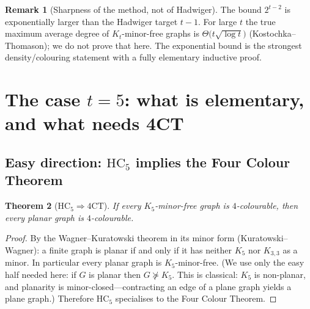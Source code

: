\documentclass[11pt]{article}
\newtheorem{theorem}{Theorem}[section]
\theoremstyle{definition}
\newtheorem{remark}[theorem]{Remark}
\begin{document}
\begin{remark}[Sharpness of the method, not of Hadwiger]
The bound \(2^{t-2}\) is exponentially larger than the Hadwiger target \(t-1\).
For large \(t\) the true maximum average degree of \(K_t\)-minor-free graphs is
\(\Theta\bigl(t\sqrt{\log t}\bigr)\) (Kostochka--Thomason); we do not prove that
here. The exponential bound is the strongest density/colouring statement with a
fully elementary inductive proof.
\end{remark}

\section{The case \(t=5\): what is elementary, and what needs 4CT}

\subsection{Easy direction: \(\mathrm{HC}_5\) implies the Four Colour Theorem}

\begin{theorem}[\(\mathrm{HC}_5\Rightarrow\mathrm{4CT}\)]\label{thm:hc5-to-4ct}
If every \(K_5\)-minor-free graph is \(4\)-colourable, then every planar graph is
\(4\)-colourable.
\end{theorem}

\begin{proof}
By the Wagner--Kuratowski theorem in its minor form (Kuratowski--Wagner): a
finite graph is planar if and only if it has neither \(K_5\) nor \(K_{3,3}\) as a
minor. In particular every planar graph is \(K_5\)-minor-free. (We use only the
easy half needed here: if \(G\) is planar then \(G\not\succcurlyeq K_5\). This is
classical: \(K_5\) is non-planar, and planarity is minor-closed---contracting an
edge of a plane graph yields a plane graph.) Therefore \(\mathrm{HC}_5\)
specialises to the Four Colour Theorem.
\end{proof}
\end{document}
